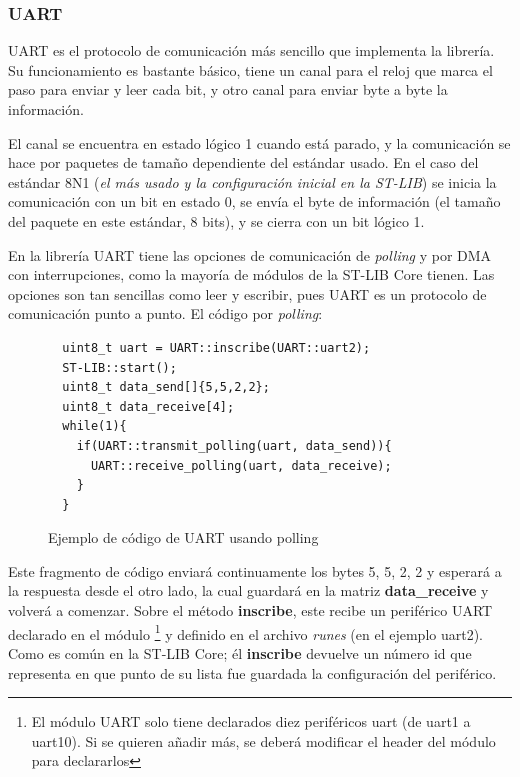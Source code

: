 \documentclass{report}
\begin{document}
\subsubsection{UART}
UART es el protocolo de comunicación más sencillo que implementa la librería. Su funcionamiento es bastante básico, tiene un canal para el reloj que marca el paso para enviar y leer cada bit, y otro canal para enviar byte a byte la información. 
\par
El canal se encuentra en estado lógico 1 cuando está parado, y la comunicación se hace por paquetes de tamaño dependiente del estándar usado. En el caso del estándar 8N1 (\textit{el más usado y la configuración inicial en la ST-LIB}) se inicia la comunicación con un bit en estado 0, se envía el byte de información (el tamaño del paquete en este estándar, 8 bits), y se cierra con un bit lógico 1.
\par \vspace{0.3cm}
En la librería UART tiene las opciones de comunicación de \textit{polling} y por DMA con interrupciones, como la mayoría de módulos de la ST-LIB Core tienen. Las opciones son tan sencillas como leer y escribir, pues UART es un protocolo de comunicación punto a punto. El código por \textit{polling}: 
\begin{figure}[h]
\begin{lstlisting}
  uint8_t uart = UART::inscribe(UART::uart2);
  ST-LIB::start();
  uint8_t data_send[]{5,5,2,2};
  uint8_t data_receive[4];
  while(1){
    if(UART::transmit_polling(uart, data_send)){
      UART::receive_polling(uart, data_receive);
    }
  }
\end{lstlisting}
\caption{Ejemplo de código de UART usando polling}
  \label{UARTwPollingcode}
\end{figure}
\par \vspace{0.3cm}
Este fragmento de código enviará continuamente los bytes 5, 5, 2, 2 y esperará a la respuesta desde el otro lado, la cual guardará en la matriz \textbf{data\_receive} y volverá a comenzar. Sobre el método \textbf{inscribe}, este recibe un periférico UART declarado en el módulo \footnote{El módulo UART solo tiene declarados diez periféricos uart (de uart1 a uart10). Si se quieren añadir más, se deberá modificar el header del módulo para declararlos} y definido en el archivo \textit{runes} (en el ejemplo uart2). Como es común en la ST-LIB Core; él \textbf{inscribe} devuelve un número id que representa en que punto de su lista fue guardada la configuración del periférico. 
\end{document}
